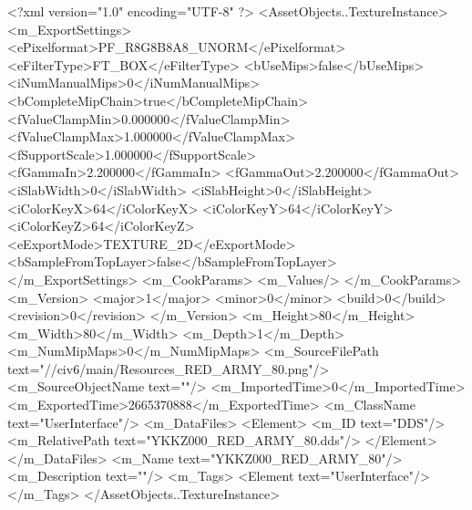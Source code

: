 <?xml version="1.0" encoding="UTF-8" ?>
<AssetObjects..TextureInstance>
	<m_ExportSettings>
		<ePixelformat>PF_R8G8B8A8_UNORM</ePixelformat>
		<eFilterType>FT_BOX</eFilterType>
		<bUseMips>false</bUseMips>
		<iNumManualMips>0</iNumManualMips>
		<bCompleteMipChain>true</bCompleteMipChain>
		<fValueClampMin>0.000000</fValueClampMin>
		<fValueClampMax>1.000000</fValueClampMax>
		<fSupportScale>1.000000</fSupportScale>
		<fGammaIn>2.200000</fGammaIn>
		<fGammaOut>2.200000</fGammaOut>
		<iSlabWidth>0</iSlabWidth>
		<iSlabHeight>0</iSlabHeight>
		<iColorKeyX>64</iColorKeyX>
		<iColorKeyY>64</iColorKeyY>
		<iColorKeyZ>64</iColorKeyZ>
		<eExportMode>TEXTURE_2D</eExportMode>
		<bSampleFromTopLayer>false</bSampleFromTopLayer>
	</m_ExportSettings>
	<m_CookParams>
		<m_Values/>
	</m_CookParams>
	<m_Version>
		<major>1</major>
		<minor>0</minor>
		<build>0</build>
		<revision>0</revision>
	</m_Version>
	<m_Height>80</m_Height>
	<m_Width>80</m_Width>
	<m_Depth>1</m_Depth>
	<m_NumMipMaps>0</m_NumMipMaps>
	<m_SourceFilePath text="//civ6/main/Resources_RED_ARMY_80.png"/>
	<m_SourceObjectName text=""/>
	<m_ImportedTime>0</m_ImportedTime>
	<m_ExportedTime>2665370888</m_ExportedTime>
	<m_ClassName text="UserInterface"/>
	<m_DataFiles>
		<Element>
			<m_ID text="DDS"/>
			<m_RelativePath text="YKKZ000_RED_ARMY_80.dds"/>
		</Element>
	</m_DataFiles>
	<m_Name text="YKKZ000_RED_ARMY_80"/>
	<m_Description text=""/>
	<m_Tags>
		<Element text="UserInterface"/>
	</m_Tags>
</AssetObjects..TextureInstance>

